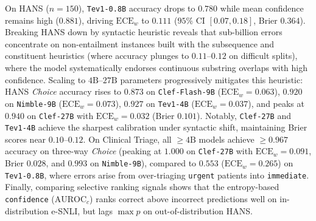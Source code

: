 \documentclass[10pt]{article}
\begin{document}
On HANS ($n=150$), \texttt{Tev1-0.8B} accuracy drops to $0.780$ while mean confidence remains high ($0.881$), driving $\text{ECE}_w$ to $0.111$ ($95\%$ CI $[0.07, 0.18]$, Brier $0.364$).
Breaking HANS down by syntactic heuristic reveals that sub-billion errors concentrate on non-entailment instances built with the subsequence and constituent heuristics (where accuracy plunges to $0.11$--$0.12$ on difficult splits), where the model systematically endorses continuous substring overlaps with high confidence.
Scaling to $4\text{B}$--$27\text{B}$ parameters progressively mitigates this heuristic: HANS \emph{Choice} accuracy rises to $0.873$ on \texttt{Clef-Flash-9B} ($\text{ECE}_w = 0.063$), $0.920$ on \texttt{Nimble-9B} ($\text{ECE}_w = 0.073$), $0.927$ on \texttt{Tev1-4B} ($\text{ECE}_w = 0.037$), and peaks at $\mathbf{0.940}$ on \texttt{Clef-27B} with $\text{ECE}_w = \mathbf{0.032}$ (Brier $0.101$).
Notably, \texttt{Clef-27B} and \texttt{Tev1-4B} achieve the sharpest calibration under syntactic shift, maintaining Brier scores near $0.10$--$0.12$.
On Clinical Triage, all $\ge 4\text{B}$ models achieve $\ge 0.967$ accuracy on three-way \emph{Choice} (peaking at $1.000$ on \texttt{Clef-27B} with $\text{ECE}_w = 0.091$, Brier $0.028$, and $0.993$ on \texttt{Nimble-9B}), compared to $0.553$ ($\text{ECE}_w = 0.265$) on \texttt{Tev1-0.8B}, where errors arise from over-triaging \texttt{urgent} patients into \texttt{immediate}.
Finally, comparing selective ranking signals shows that the entropy-based \texttt{confidence} ($\text{AUROC}_c$) ranks correct above incorrect predictions well on in-distribution e-SNLI, but lags $\max p$ on out-of-distribution HANS.

\begin{table}[t]
\centering
\caption{Calibration of \texttt{Tev1-0.8B} on clean inputs across the full expanded $N=450$ cohort ($n=150$ per dataset; see Table~\ref{tab:scaling} for cross-model comparison from $0.8\text{B}$ to $27\text{B}$). ECE$_w$ and ECE$_m$ use $10$ equal-width and equal-mass bins. AUROC$_p$ and AUROC$_c$ are selective AUROCs of $\max p$ and of the provider \texttt{confidence}. Best head per dataset is in \textbf{bold}.}
\label{tab:calib}
\resizebox{\textwidth}{!}{}
\end{table}
\end{document}
